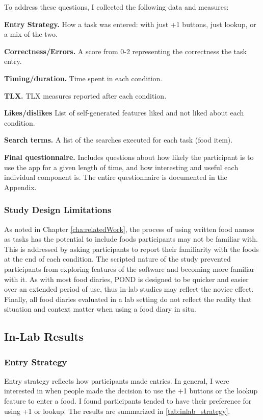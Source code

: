 To address these questions, I collected the following data and measures: 

\begin{enumerate*}
\item \textbf{Entry Strategy.} How a task was entered: with just +1 buttons, just lookup, or a mix of the two. 
\item \textbf{Correctness/Errors. } A score from 0-2 representing the correctness the task entry. 
\item \textbf{Timing/duration.} Time spent in each condition. 
\item \textbf{TLX.} TLX \citep{Hart2006} measures reported after each condition. 
\item \textbf{Likes/dislikes} List of self-generated features liked and not liked about each condition. 
\item \textbf{Search terms.} A list of the searches executed for each task (food item). 
\item \textbf{Final questionnaire.} Includes questions about how likely the participant is to use the app for a given length of time, and how interesting and useful each individual component is. The entire questionnaire is documented in the Appendix. 
\end{enumerate*}


\subsubsection{Study Design Limitations}
As noted in Chapter \ref{cha:relatedWork}, the process of using written food names as tasks has the potential to include foods participants may not be familiar with. This is addressed by asking participants to report their familiarity with the foods at the end of each condition. The scripted nature of the study prevented participants from exploring features of the software and becoming more familiar with it. As with most food diaries, POND is designed to be quicker and easier over an extended period of use, thus in-lab studies may reflect the novice effect. Finally, all food diaries evaluated in a lab setting do not reflect the reality that  situation and context matter when using a food diary in situ. 

\subsection{In-Lab Results}

\subsubsection{Entry Strategy}
Entry strategy reflects how participants made entries. In general, I were interested in when people made the decision to use the +1 buttons or the lookup feature to enter a food. I found participants tended to have their preference for using +1 or lookup. The results are summarized in \ref{tab:inlab_strategy}. 

